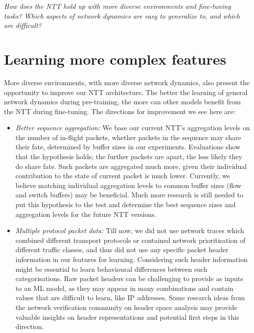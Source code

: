 \emph{How does the NTT hold up with more diverse environments and fine-tuning tasks? Which aspects of network dynamics are easy to generalize to, and which are difficult?}

\section{Learning more complex features}
\label{sec:compftt}

More diverse environments, \ie with more diverse network dynamics, also present the opportunity to improve our NTT architecture. The better the learning of general network dynamics during pre-training, the more can other models benefit from the NTT during fine-tuning. The directions for improvement we see here are: 

\begin{itemize}
\item \emph{Better sequence aggregation:} We base our current NTT's aggregation levels on the number of in-flight packets, \ie whether packets in the sequence may share their fate, determined by buffer sizes in our experiments. Evaluations show that the hypothesis holds; the further packets are apart, the less likely they do share fate. Such packets are aggregated much more, given their individual contribution to the state of current packet is much lower. Currently, we believe matching individual aggregation levels to common buffer sizes (\eg flow and switch buffers) may be beneficial. Much more research is still needed to put this hypothesis to the test and determine the best sequence sizes and aggregation levels for the future NTT versions.

\item \emph{Multiple protocol packet data:} Till now, we did not use network traces which combined different transport protocols or contained network prioritisation of different traffic classes, and thus did not use any specific packet header information in our features for learning. Considering such header information might be essential to learn behavioural differences between such categorisations. Raw packet headers can be challenging to provide as inputs to an ML model, as they may appear in many combinations and contain values that are difficult to learn, like IP addresses\cite{zhangMimicNetFastPerformance2021}. Some research ideas from the network verification community on header space analysis\cite{kazemianHeaderSpaceAnalysis} may provide valuable insights on header representations and potential first steps in this direction.


\end{itemize}
